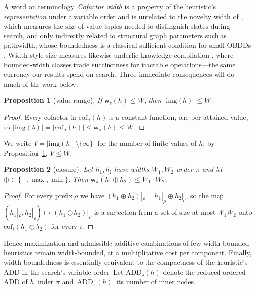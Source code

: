\documentclass[letterpaper]{article}
\newcommand{\width}{\ensuremath{\mathsf{w}}}
\newcommand{\values}{\ensuremath{V}}
\newcommand{\sub}[2]{\ensuremath{\mathrm{cof}_{#1}(#2)}}
\newcommand{\img}{\ensuremath{\mathrm{img}}}
\theoremstyle{plain}
\newtheorem{proposition}{Proposition}
\theoremstyle{definition}
\theoremstyle{remark}
\begin{document}
A word on terminology. \emph{Cofactor width} is a property of the
heuristic's \emph{representation} under a variable order and is
unrelated to the novelty width of \citet{lipovetzky-geffner-ecai2012},
which measures the size of value tuples needed to distinguish states
during search, and only indirectly related to structural graph
parameters such as pathwidth, whose boundedness is a classical
sufficient condition for small OBDDs \citep{wegener-2000}. Width-style size measures likewise underlie knowledge
compilation \citep{darwiche-marquis-jair2002,darwiche-ijcai2011}, where
bounded-width classes trade succinctness for tractable operations---the
same currency our results spend on search. Three
immediate consequences will do much of the work below.

\begin{proposition}[value range]
\label{prop-range}
If $\width_\pi(h) \leq W$, then $|\img(h)| \leq W$.
\end{proposition}

\begin{proof}
Every cofactor in $\sub{n}{h}$ is a constant function, one per attained
value, so $|\img(h)| = |\sub{n}{h}| \leq \width_\pi(h) \leq W$.
\end{proof}

We write $\values = |\img(h) \setminus \{\infty\}|$ for the number of
finite values of $h$; by Proposition~\ref{prop-range},
$\values \leq W$.

\begin{proposition}[closure]
\label{prop-closure}
Let $h_1, h_2$ have widths $W_1, W_2$ under $\pi$ and let
$\oplus \in \{+, \max, \min\}$. Then
$\width_\pi(h_1 \oplus h_2) \leq W_1 \cdot W_2$.
\end{proposition}

\begin{proof}
For every prefix $\rho$ we have
$(h_1 \oplus h_2)|_\rho = h_1|_\rho \oplus h_2|_\rho$, so the map
$(h_1|_\rho, h_2|_\rho) \mapsto (h_1 \oplus h_2)|_\rho$ is a surjection
from a set of size at most $W_1 W_2$ onto $\sub{i}{h_1 \oplus h_2}$ for
every $i$.
\end{proof}

Hence maximization and admissible additive combinations of few
width-bounded heuristics remain width-bounded, at a multiplicative cost
per component. Finally, width-boundedness is essentially equivalent to
the compactness of the heuristic's ADD in the search's variable order.
Let $\mathrm{ADD}_\pi(h)$ denote the reduced ordered ADD of $h$ under
$\pi$ \citep{bahar-et-al-iccad1993} and $|\mathrm{ADD}_\pi(h)|$ its
number of inner nodes.
\end{document}
